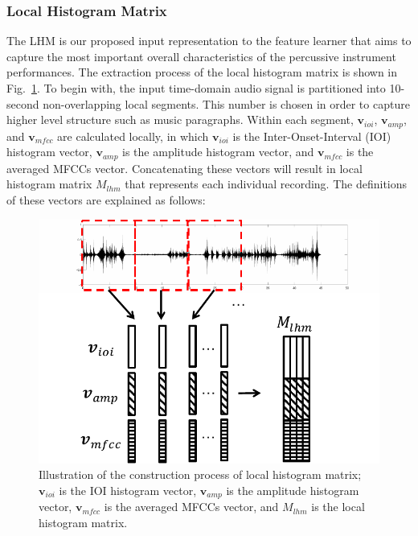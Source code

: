 \documentclass[conference]{IEEEtran}
\begin{document}
\subsubsection{Local Histogram Matrix}
The LHM is our proposed input representation to the feature learner that aims to capture the most important overall characteristics of the percussive instrument performances. The extraction process of the local histogram matrix is shown in Fig.~\ref{fig:hist_mat}. To begin with, the input time-domain audio signal is partitioned into 10-second non-overlapping local segments. This number is chosen in order to capture higher level structure such as music paragraphs. Within each segment, $\mathbf{v}_{ioi}$, $\mathbf{v}_{amp}$, and $\mathbf{v}_{mfcc}$ are calculated locally, in which $\mathbf{v}_{ioi}$ is the Inter-Onset-Interval (IOI) histogram vector, $\mathbf{v}_{amp}$ is the amplitude histogram vector, and $\mathbf{v}_{mfcc}$ is the averaged MFCCs vector. Concatenating these vectors will result in local histogram matrix $M_{lhm}$ that represents each individual recording. The definitions of these vectors are explained as follows:
\begin{figure}
    \centering
    \includegraphics[width = 8 cm]{./figs/hist_mat.pdf}
    \caption{Illustration of the construction process of local histogram matrix; $\mathbf{v}_{ioi}$ is the IOI histogram vector, $\mathbf{v}_{amp}$ is the amplitude histogram vector, $\mathbf{v}_{mfcc}$ is the averaged MFCCs vector, and $M_{lhm}$ is the local histogram matrix.}
    \label{fig:hist_mat}
\end{figure}
\end{document}
